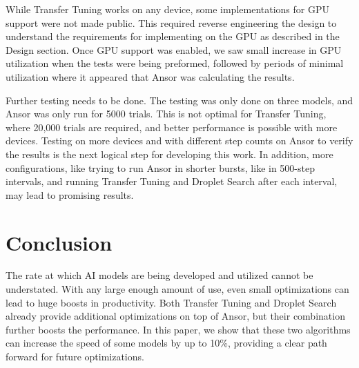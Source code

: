\documentclass[conference]{IEEEtran}
\begin{document}
While Transfer Tuning works on any device, some implementations for GPU support were not made public. This required reverse engineering the design to understand the requirements for implementing on the GPU as described in the Design section. Once GPU support was enabled, we saw small increase in GPU utilization when the tests were being preformed, followed by periods of minimal utilization where it appeared that Ansor was calculating the results.

Further testing needs to be done. The testing was only done on three models, and Ansor was only run for 5000 trials. This is not optimal for Transfer Tuning, where 20,000 trials are required, and better performance is possible with more devices. Testing on more devices and with different step counts on Ansor to verify the results is the next logical step for developing this work. In addition, more configurations, like trying to run Ansor in shorter bursts, like in 500-step intervals, and running Transfer Tuning and Droplet Search after each interval, may lead to promising results.

\section{Conclusion}
The rate at which AI models are being developed and utilized cannot be understated. With any large enough amount of use, even small optimizations can lead to huge boosts in productivity. Both Transfer Tuning and Droplet Search already provide additional optimizations on top of Ansor, but their combination further boosts the performance. In this paper, we show that these two algorithms can increase the speed of some models by up to 10\%, providing a clear path forward for future optimizations.

\printbibliography
\end{document}
